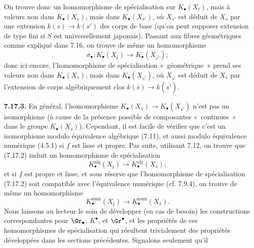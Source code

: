 On
trouve donc un homomorphisme de spécialisation sur \(K_\bullet(X_t)\), mais à valeurs non dans \(K_\bullet(X_s)\), mais dans \(K_\bullet(X_{s'})\), où \(X_{s'}\) est déduit de \(X_s\) par une extension \(k(s)\to k(s')\) des corps de base (qu'on peut supposer extension de type fini si \(S\) est universellement japonais). Passant aux fibres géométriques comme expliqué dans 7.16, on trouve de même un homomorphisme
\begin{equation}\tag{7.17.2}
  \sigma_\bullet:K_\bullet(X_{\bar t})\longrightarrow K_\bullet(X_{\overline{s'}});
\end{equation}
donc ici encore, l'homomorphisme de spécialisation «~géométrique~» prend ses valeurs non dans \(K_\bullet(X_{\bar s})\), mais dans \(K_\bullet(X_{\overline{s'}})\), où \(X_{\overline{s'}}\) est déduit de \(X_{\bar s}\) par l'extension de corps algébriquement clos \(k(\bar s)\to k(\overline{s'})\).

\textbf{7.17.3.} En général, l'homomorphisme \(K_\bullet(X_{\bar s})\to K_\bullet(X_{\overline{s'}})\) n'est pas un isomorphisme (à cause de la présence possible de composantes «~continues~» dans le groupe \(K_\bullet(X_{\bar s})\)). Cependant, il est facile de vérifier que c'est un isomorphisme modulo équivalence algébrique (7.11), et aussi modulo équivalence numérique (4.5.1) si \(f\) est lisse et propre. Par suite, utilisant 7.12, on trouve que (7.17.2) induit un homomorphisme de spécialisation
\begin{equation}\tag{7.17.3.1}
  K_\bullet^{\mathrm{alg}}(X_{\bar t})\longrightarrow
  K_\bullet^{\mathrm{alg}}(X_{\bar s});
\end{equation}
et si \(f\) est propre et lisse, et sous réserve que l'homomorphisme de spécialisation (7.17.2) soit compatible avec l'équivalence numérique (cf. 7.9.4), on trouve de même un homomorphisme
\begin{equation}\tag{7.17.3.2}
  K_\bullet^{\mathrm{num}}(X_{\bar t})\longrightarrow
  K_\bullet^{\mathrm{num}}(X_{\bar s}).
\end{equation}
Nous laissons au lecteur le soin de développer (en cas de besoin) les constructions correspondantes pour \(\Gr_\bullet\), \(K^\bullet\), et \(\Gr^\bullet\), et les propriétés de ces homomorphismes de spécialisation qui résultent trivialement des propriétés développées dans les sections précédentes. Signalons seulement qu'il
